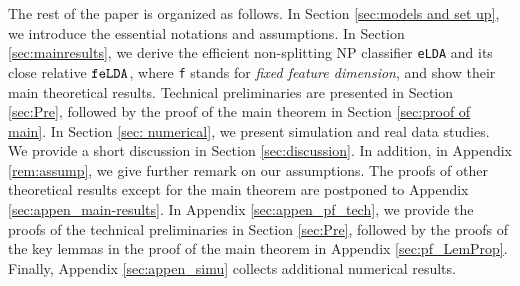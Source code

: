 \documentclass[12pt]{article}
\numberwithin{equation}{section}
\theoremstyle{remark}
\newcommand{\1}{{\rm 1}\kern-0.24em{\rm I}}
\begin{document}
 
 
 
 The rest of the paper is organized as follows.  In Section \ref{sec:models and set up}, we introduce the essential notations and assumptions.  In Section \ref{sec:mainresults}, we derive the efficient non-splitting NP classifier \verb+eLDA+ and its close relative $\verb+feLDA+$, where \verb+f+ stands for \textit{fixed feature dimension}, and show their main theoretical results. Technical preliminaries are presented in Section \ref{sec:Pre}, followed by the proof of the main theorem in Section \ref{sec:proof of main}.    In Section \ref{sec: numerical}, we present simulation and real data studies.  We provide a short discussion in Section \ref{sec:discussion}. In addition, in Appendix \ref{rem:assump}, we give further remark on our assumptions. The proofs of other theoretical results except for the main theorem are postponed to Appendix \ref{sec:appen_main-results}. In Appendix \ref{sec:appen_pf_tech}, we provide the proofs of the technical preliminaries in  Section \ref{sec:Pre}, followed by the proofs of the key lemmas in the proof of the main theorem in  Appendix \ref{sec:pf_LemProp}.  Finally, Appendix \ref{sec:appen_simu}  collects additional numerical results.
 
  
\end{document}
